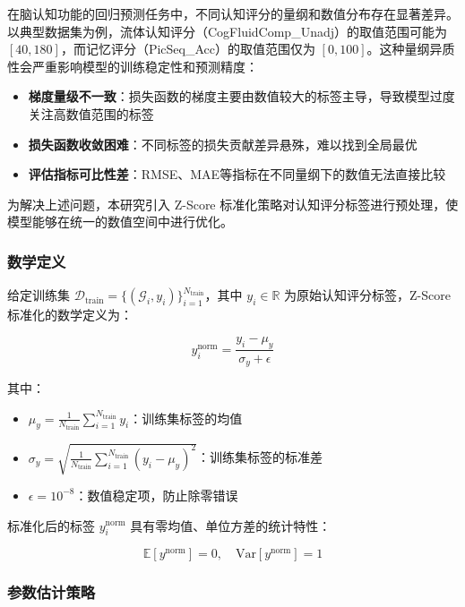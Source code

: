 \documentclass[UTF8, a4paper, 12pt]{article}
\begin{document}
在脑认知功能的回归预测任务中，不同认知评分的量纲和数值分布存在显著差异。以典型数据集为例，流体认知评分（CogFluidComp\_Unadj）的取值范围可能为 $[40, 180]$，而记忆评分（PicSeq\_Acc）的取值范围仅为 $[0, 100]$。这种量纲异质性会严重影响模型的训练稳定性和预测精度：

\begin{itemize}
    \item \textbf{梯度量级不一致}：损失函数的梯度主要由数值较大的标签主导，导致模型过度关注高数值范围的标签
    \item \textbf{损失函数收敛困难}：不同标签的损失贡献差异悬殊，难以找到全局最优
    \item \textbf{评估指标可比性差}：RMSE、MAE等指标在不同量纲下的数值无法直接比较
\end{itemize}

为解决上述问题，本研究引入 Z-Score 标准化策略对认知评分标签进行预处理，使模型能够在统一的数值空间中进行优化。

\subsubsection{数学定义}

给定训练集 $\mathcal{D}_{\text{train}} = \{(\mathcal{G}_i, y_i)\}_{i=1}^{N_{\text{train}}}$，其中 $y_i \in \mathbb{R}$ 为原始认知评分标签，Z-Score 标准化的数学定义为：

\begin{equation}
y_i^{\text{norm}} = \frac{y_i - \mu_y}{\sigma_y + \epsilon}
\end{equation}

其中：
\begin{itemize}
    \item $\mu_y = \frac{1}{N_{\text{train}}} \sum_{i=1}^{N_{\text{train}}} y_i$：训练集标签的均值
    \item $\sigma_y = \sqrt{\frac{1}{N_{\text{train}}} \sum_{i=1}^{N_{\text{train}}} (y_i - \mu_y)^2}$：训练集标签的标准差
    \item $\epsilon = 10^{-8}$：数值稳定项，防止除零错误
\end{itemize}

标准化后的标签 $y_i^{\text{norm}}$ 具有零均值、单位方差的统计特性：

\begin{equation}
\mathbb{E}[y^{\text{norm}}] = 0, \quad \text{Var}[y^{\text{norm}}] = 1
\end{equation}

\subsubsection{参数估计策略}
\end{document}
